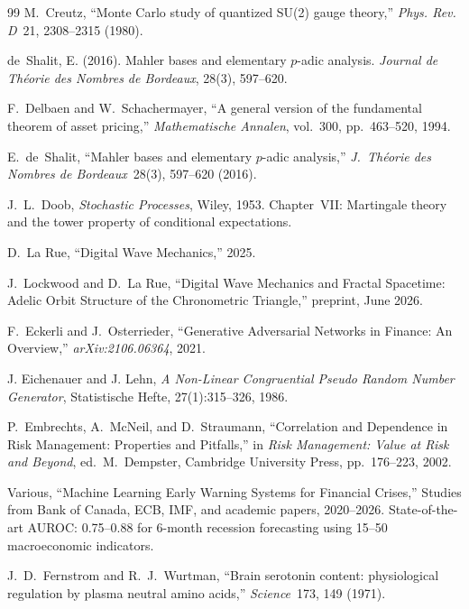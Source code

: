 \documentclass[12pt,oneside]{book}
\begin{document}
\begin{thebibliography}{99}
M.~Creutz,
``Monte Carlo study of quantized SU(2) gauge theory,''
\emph{Phys. Rev. D}\ 21, 2308--2315 (1980).

de~Shalit, E. (2016).
Mahler bases and elementary $p$-adic analysis.
\textit{Journal de Th\'eorie des Nombres de Bordeaux}, 28(3), 597--620.

F.~Delbaen and W.~Schachermayer,
``A general version of the fundamental theorem of asset pricing,''
\emph{Mathematische Annalen}, vol.~300, pp.~463--520, 1994.

E.~de~Shalit, ``Mahler bases and elementary $p$-adic analysis,'' \emph{J.\ Th\'eorie des Nombres de Bordeaux}\ 28(3), 597--620 (2016).

J.~L.~Doob,
\emph{Stochastic Processes},
Wiley, 1953.
Chapter~VII: Martingale theory and the tower property of conditional expectations.

D.~La Rue,
``Digital Wave Mechanics,'' 2025.

J.~Lockwood and D.~La Rue, ``Digital Wave Mechanics and Fractal Spacetime: Adelic Orbit Structure of the Chronometric Triangle,'' preprint, June 2026.

F.~Eckerli and J.~Osterrieder,
``Generative Adversarial Networks in Finance: An Overview,''
\emph{arXiv:2106.06364}, 2021.

J. Eichenauer and J. Lehn,
\textit{A Non-Linear Congruential Pseudo Random Number Generator},
Statistische Hefte, 27(1):315--326, 1986.

P.~Embrechts, A.~McNeil, and D.~Straumann,
``Correlation and Dependence in Risk Management: Properties and Pitfalls,''
in \emph{Risk Management: Value at Risk and Beyond}, ed.\ M.~Dempster,
Cambridge University Press, pp.~176--223, 2002.


Various,
``Machine Learning Early Warning Systems for Financial Crises,''
Studies from Bank of Canada, ECB, IMF, and academic papers, 2020--2026.
State-of-the-art AUROC: 0.75--0.88 for 6-month recession forecasting using 15--50 macroeconomic indicators.

J.~D.~Fernstrom and R.~J.~Wurtman, ``Brain serotonin content: physiological regulation by plasma neutral amino acids,'' \emph{Science}\ 173, 149 (1971).


\end{thebibliography}
\end{document}
